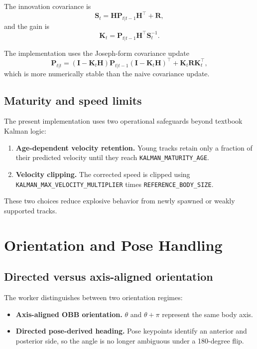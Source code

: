 \documentclass[11pt]{article}
\newcommand{\runtimekey}[1]{\texttt{#1}}
\begin{document}
The innovation covariance is
\begin{equation}
  \mathbf{S}_t = \mathbf{H}\mathbf{P}_{t|t-1}\mathbf{H}^\top + \mathbf{R},
\end{equation}
and the gain is
\begin{equation}
  \mathbf{K}_t = \mathbf{P}_{t|t-1}\mathbf{H}^\top \mathbf{S}_t^{-1}.
\end{equation}

The implementation uses the Joseph-form covariance update
\begin{equation}
  \mathbf{P}_{t|t} =
  (\mathbf{I} - \mathbf{K}_t\mathbf{H})\mathbf{P}_{t|t-1}(\mathbf{I} - \mathbf{K}_t\mathbf{H})^\top
  + \mathbf{K}_t \mathbf{R}\mathbf{K}_t^\top,
\end{equation}
which is more numerically stable than the naive covariance update.

\subsection{Maturity and speed limits}

The present implementation uses two operational safeguards beyond textbook Kalman logic:

\begin{enumerate}
  \item \textbf{Age-dependent velocity retention.} Young tracks retain only a fraction of their predicted velocity until they reach \runtimekey{KALMAN\_MATURITY\_AGE}.
  \item \textbf{Velocity clipping.} The corrected speed is clipped using \runtimekey{KALMAN\_MAX\_VELOCITY\_MULTIPLIER} times \runtimekey{REFERENCE\_BODY\_SIZE}.
\end{enumerate}

These two choices reduce explosive behavior from newly spawned or weakly supported tracks.

\section{Orientation and Pose Handling}

\subsection{Directed versus axis-aligned orientation}

The worker distinguishes between two orientation regimes:

\begin{itemize}
  \item \textbf{Axis-aligned OBB orientation.} $\theta$ and $\theta + \pi$ represent the same body axis.
  \item \textbf{Directed pose-derived heading.} Pose keypoints identify an anterior and posterior side, so the angle is no longer ambiguous under a 180-degree flip.
\end{itemize}
\end{document}
